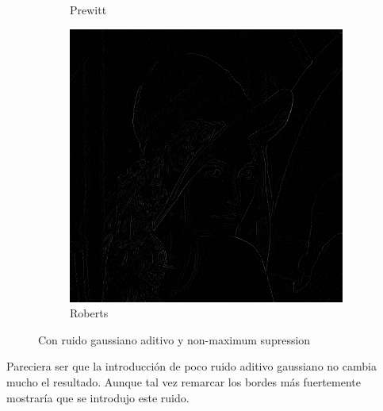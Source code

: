 \documentclass[a4paper]{article}
\begin{document}
\begin{figure}[H]
\begin{subfigure}[t]{0.3\textwidth}
	\caption{Prewitt}
	\end{subfigure}
	\begin{subfigure}[t]{0.3\textwidth}
	\centering
	\includegraphics[width=\textwidth]{imagenesInforme/lenaNonMaximumSupressionGaussianRoberts}
	\caption{Roberts}
	\end{subfigure}
\caption{Con ruido gaussiano aditivo y non-maximum supression}
\end{figure}

Pareciera ser que la introducción de poco ruido aditivo gaussiano no cambia mucho el resultado. Aunque tal vez remarcar los bordes más fuertemente mostraría que se introdujo este ruido.
\end{document}
